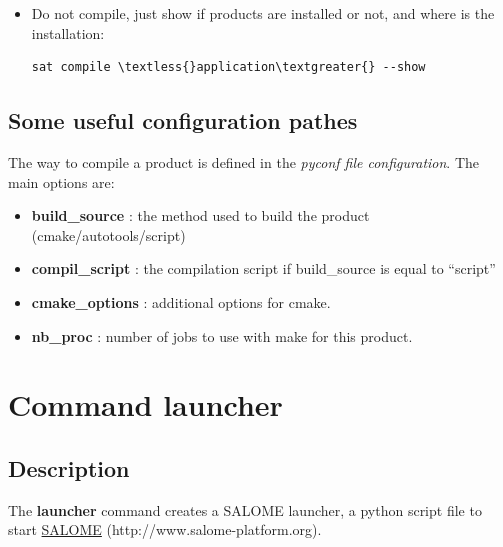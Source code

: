 \documentclass[a4paper,10pt,english]{sphinxmanual}
\begin{document}
\begin{itemize}
\begin{Verbatim}[commandchars=\\\{\}]
sat compile \textless{}product\textgreater{} --stop\_first\_fail
\end{Verbatim}

\item {} 
Do not compile, just show if products are installed or not, and where is the installation:

\begin{Verbatim}[commandchars=\\\{\}]
sat compile \textless{}application\textgreater{} --show
\end{Verbatim}

\end{itemize}


\subsection{Some useful configuration pathes}
\label{commands/compile:some-useful-configuration-pathes}
The way to compile a product is defined in the \emph{pyconf file configuration}.
The main options are:
\begin{itemize}
\item {} 
\textbf{build\_source} : the method used to build the product (cmake/autotools/script)

\item {} 
\textbf{compil\_script} : the compilation script if build\_source is equal to ``script''

\item {} 
\textbf{cmake\_options} : additional options for cmake.

\item {} 
\textbf{nb\_proc} : number of jobs to use with make for this product.

\end{itemize}


\section{Command launcher}
\label{commands/launcher:svn}\label{commands/launcher:command-launcher}\label{commands/launcher::doc}

\subsection{Description}
\label{commands/launcher:description}
The \textbf{launcher} command creates a SALOME launcher, a python script file to start \href{http://www.salome-platform.org}{SALOME} (http://www.salome-platform.org).
\end{document}
